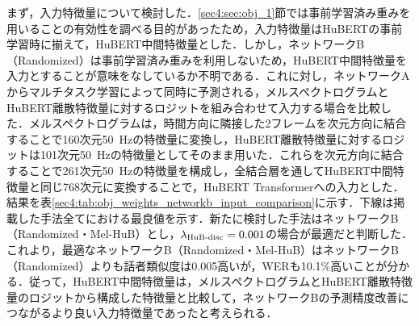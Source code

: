 まず，入力特徴量について検討した．\ref{sec4:sec:obj_1}節では事前学習済み重みを用いることの有効性を調べる目的があったため，入力特徴量はHuBERTの事前学習時に揃えて，HuBERT中間特徴量とした．しかし，ネットワークB（Randomized）は事前学習済み重みを利用しないため，HuBERT中間特徴量を入力とすることが意味をなしているか不明である．これに対し，ネットワークAからマルチタスク学習によって同時に予測される，メルスペクトログラムとHuBERT離散特徴量に対するロジットを組み合わせて入力する場合を比較した．メルスペクトログラムは，時間方向に隣接した2フレームを次元方向に結合することで160次元\SI{50}{\Hz}の特徴量に変換し，HuBERT離散特徴量に対するロジットは101次元\SI{50}{\Hz}の特徴量としてそのまま用いた．これらを次元方向に結合することで261次元\SI{50}{\Hz}の特徴量を構成し，全結合層を通してHuBERT中間特徴量と同じ768次元に変換することで，HuBERT Transformerへの入力とした．結果を表\ref{sec4:tab:obj_weights_networkb_input_comparison}に示す．下線は掲載した手法全てにおける最良値を示す．新たに検討した手法はネットワークB（Randomized・Mel-HuB）とし，$\lambda_{\text{HuB-disc}} = 0.001$の場合が最適だと判断した．これより，最適なネットワークB（Randomized・Mel-HuB）はネットワークB（Randomized）よりも話者類似度は0.005高いが，WERも10.1\%高いことが分かる．従って，HuBERT中間特徴量は，メルスペクトログラムとHuBERT離散特徴量のロジットから構成した特徴量と比較して，ネットワークBの予測精度改善につながるより良い入力特徴量であったと考えられる．

